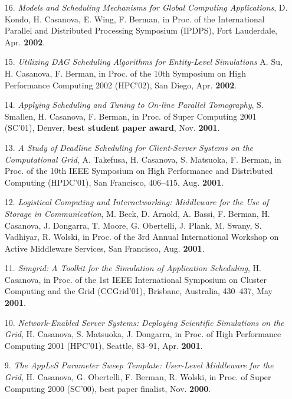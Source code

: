 \begin{enumerate}
\item[16.]
{\it Models and Scheduling Mechanisms for Global Computing Applications},
D. Kondo, H. Casanova, E. Wing, F. Berman, in Proc. of the
International Parallel and Distributed Processing Symposium (IPDPS),
Fort Lauderdale, Apr. {\bf 2002}.

\item[15.]
{\it Utilizing DAG Scheduling Algorithms for Entity-Level Simulations}
A. Su, H. Casanova, F. Berman, in Proc. of the 10th Symposium on
High Performance Computing 2002 (HPC'02), San Diego, Apr. {\bf 2002}.

\item[14.]
{\it Applying Scheduling and Tuning to On-line Parallel Tomography},
S. Smallen, H. Casanova, F. Berman, in Proc. of Super Computing 2001
(SC'01), Denver, {\bf best student paper award}, Nov. {\bf 2001}.

\item[13.]
{\it A Study of Deadline Scheduling for Client-Server Systems on the
Computational Grid}, A. Takefusa, H. Casanova, S. Matsuoka, F. Berman, in
Proc. of the 10th IEEE Symposium on High Performance and Distributed
Computing (HPDC'01), San Francisco, 406--415, Aug. {\bf 2001}.

\item[12.]
{\it Logistical Computing and Internetworking: Middleware for the Use
of Storage in Communication}, M. Beck, D. Arnold, A. Bassi, F. Berman,
H. Casanova, J. Dongarra, T. Moore, G. Obertelli, J. Plank, M. Swany,
S. Vadhiyar, R. Wolski, in Proc. of the 3rd Annual International
Workshop on Active Middleware Services, San Francisco, Aug. {\bf 2001}.

\item[11.]
{\it Simgrid: A Toolkit for the Simulation of Application Scheduling},
H. Casanova, in Proc. of the 1st IEEE International Symposium
on Cluster Computing and the Grid (CCGrid'01), Brisbane, Australia,
430--437, May {\bf 2001}.

\item[10.]
{\it Network-Enabled Server Systems: Deploying Scientific Simulations on
the Grid}, H. Casanova, S. Matsuoka, J. Dongarra, in Proc. of High
Performance Computing 2001 (HPC'01), Seattle, 83--91, Apr. {\bf 2001}.

\item[9.]
{\it The AppLeS Parameter Sweep Template: User-Level Middleware for the
Grid}, H. Casanova, G. Obertelli, F. Berman, R. Wolski, in Proc.
of Super Computing 2000 (SC'00), best paper finalist, Nov. {\bf 2000}.


\end{enumerate}
